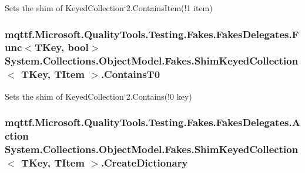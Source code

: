 Sets the shim of Keyed\-Collection`2.Contains\-Item(!1 item)

\hypertarget{class_system_1_1_collections_1_1_object_model_1_1_fakes_1_1_shim_keyed_collection_3_01_t_key_00_01_t_item_01_4_a974e3201ff6ce5bceb88849de39cc454}{
\subsubsection[{Contains\-T0}]{\setlength{\rightskip}{0pt plus 5cm}mqttf.\-Microsoft.\-Quality\-Tools.\-Testing.\-Fakes.\-Fakes\-Delegates.\-Func$<$T\-Key, bool$>$ System.\-Collections.\-Object\-Model.\-Fakes.\-Shim\-Keyed\-Collection$<$ T\-Key, T\-Item $>$.Contains\-T0\hspace{0.3cm}{\ttfamily [set]}}}\label{class_system_1_1_collections_1_1_object_model_1_1_fakes_1_1_shim_keyed_collection_3_01_t_key_00_01_t_item_01_4_a974e3201ff6ce5bceb88849de39cc454}


Sets the shim of Keyed\-Collection`2.Contains(!0 key)

\hypertarget{class_system_1_1_collections_1_1_object_model_1_1_fakes_1_1_shim_keyed_collection_3_01_t_key_00_01_t_item_01_4_a910d6c888fea98902c9139829d854d91}{
\subsubsection[{Create\-Dictionary}]{\setlength{\rightskip}{0pt plus 5cm}mqttf.\-Microsoft.\-Quality\-Tools.\-Testing.\-Fakes.\-Fakes\-Delegates.\-Action System.\-Collections.\-Object\-Model.\-Fakes.\-Shim\-Keyed\-Collection$<$ T\-Key, T\-Item $>$.Create\-Dictionary\hspace{0.3cm}{\ttfamily [set]}}}\label{class_system_1_1_collections_1_1_object_model_1_1_fakes_1_1_shim_keyed_collection_3_01_t_key_00_01_t_item_01_4_a910d6c888fea98902c9139829d854d91}


